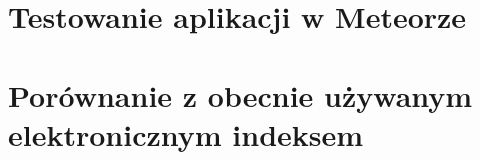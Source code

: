 \documentclass[brudnopis]{xmgr}
\begin{document}
\chapter{Testowanie aplikacji w Meteorze}

\chapter{Porównanie z obecnie używanym elektronicznym indeksem}

\summary





\cite{MeteorDocs}
\cite{NodeDocs}
\cite{MongoDocs}
\cite{Mesosphere}
\cite{DiscoverMeteor2013}
\cite{ScalingMongoDB2011}
\cite{ScalingWithMongoDB}
\cite{Laika}
\cite{TinyTest}

%
%

\begin{bibdiv}
\begin{biblist}


\end{biblist}
\end{bibdiv}



\oswiadczenie
\end{document}
